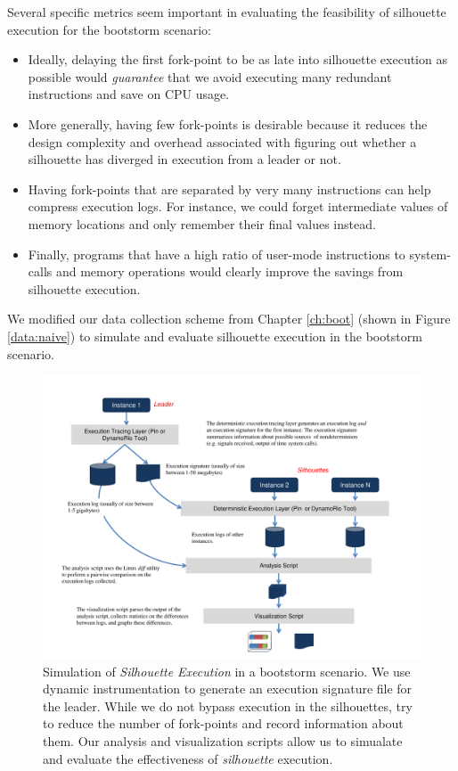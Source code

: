 Several specific metrics seem important in
evaluating the feasibility of silhouette
execution for the bootstorm scenario:
\begin{itemize}
\item Ideally, delaying the first fork-point
to be as late into silhouette execution as possible
would {\em guarantee} that we avoid
executing many redundant instructions and
save on CPU usage.
\item More generally, having few
fork-points is desirable because it reduces
the design complexity and overhead associated with 
figuring out whether a silhouette has diverged
in execution from a leader or not.
\item Having fork-points that are
separated by very many instructions
can help compress execution logs.
For instance, we could forget intermediate
values of memory locations and only
remember their final values instead.
\item Finally, programs that have a high
ratio of user-mode instructions to system-calls
and memory operations would clearly 
improve the savings from silhouette execution.
\end{itemize}


We modified our data collection scheme from Chapter \ref{ch:boot} (shown in 
Figure \ref{data:naive}) to simulate and
evaluate silhouette execution in the bootstorm scenario.

\begin{figure}[]
  \center
  \includegraphics[scale=0.7, trim=1cm 0cm 1cm 0cm]
                  {simulation.pdf}
  \caption[Simulation of {\em Silhouette Execution} in a bootstorm scenario]%
  {Simulation of {\em Silhouette Execution} in a bootstorm scenario.
    We use dynamic instrumentation to 
    generate an execution signature file for the leader.
    While we do not bypass execution in the 
    silhouettes, try to reduce the number of fork-points 
    and record information about them.
    Our analysis and visualization
    scripts allow us to simualate and evaluate
    the effectiveness of {\em silhouette} execution.
  }
  \label{ch3:figsimulation}
\end{figure}

